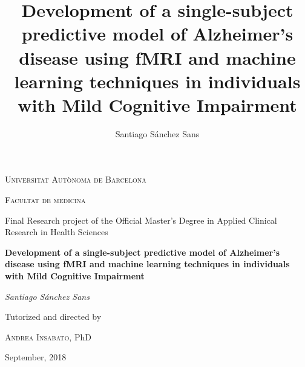 \documentclass[a4paper,12pt]{elsarticle}  %
\title{Development of a single-subject predictive model of Alzheimer's disease using fMRI and machine learning techniques in individuals with Mild Cognitive Impairment}
\author{Santiago Sánchez Sans}
\begin{document}
 	


\begin{titlepage}
	\centering

	{\scshape\LARGE Universitat Autònoma de Barcelona \par}

			\vspace{0.5cm}

	{\scshape\Large Facultat de medicina\par}

			\vspace{1cm}

	{\Large Final Research project of the Official Master's Degree in Applied Clinical Research in Health Sciences\par}
			\vspace{1cm}
	{\Large\bfseries Development of a single-subject predictive model of Alzheimer's disease using fMRI and machine learning techniques in individuals with Mild Cognitive Impairment\par}
	
	

			\vspace{2cm}

	{\Large\itshape Santiago Sánchez Sans\par}

			\vfill

	Tutorized and directed by\par
	\textsc{Andrea Insabato}, PhD
	
			\vfill

	
		
	{\large September, 2018\par}
\end{titlepage}

\clearpage
\end{document}
